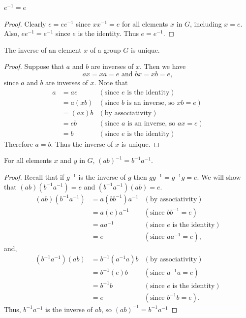 \newpage

\begin{proposition}
    $e^{-1} = e$
\end{proposition}
\begin{proof}
    Clearly $e = ee^{-1}$ since $xx^{-1} = e$ for all elements $x$ in $G$, including $x = e$. Also, $ee^{-1} = e^{-1}$ since $e$ is the identity. Thus $e = e^{-1}$.
\end{proof}

\begin{proposition}
    The inverse of an element $x$ of a group $G$ is unique.
\end{proposition}
\begin{proof}
    Suppose that $a$ and $b$ are inverses of $x$. Then we have
    \[
        ax = xa = e \text{ and } bx = xb = e,
    \]
    since $a$ and $b$ are inverses of $x$. Note that
    \begin{align*}
        a &= ae & (\text{since } e \text{ is the identity})\\
        &= a(xb) & (\text{since } b \text{ is an inverse, so } xb = e)\\
        &= (ax)b & (\text{by associativity})\\
        &= eb & (\text{since } a \text{ is an inverse, so } ax = e)\\
        &= b & (\text{since } e \text{ is the identity})
    \end{align*}
    Therefore $a = b$. Thus the inverse of $x$ is unique.
\end{proof}

\begin{proposition}
    For all elements $x$ and $y$ in $G$, $(ab)^{-1} = b^{-1}a^{-1}$.
\end{proposition}
\begin{proof}
    Recall that if $g^{-1}$ is the inverse of $g$ then $gg^{-1} = g^{-1}g = e$. We will show that $(ab)(b^{-1}a^{-1}) = e$ and $(b^{-1}a^{-1})(ab) = e$.
    \begin{align*}
        (ab)(b^{-1}a^{-1}) &= a(bb^{-1})a^{-1} & (\text{by associativity})\\
        &= a(e)a^{-1} & (\text{since } bb^{-1} = e)\\
        &= aa^{-1} & (\text{since } e \text{ is the identity})\\
        &= e & (\text{since } aa^{-1} = e),
    \end{align*}
    and,
    \begin{align*}
        (b^{-1}a^{-1})(ab) &= b^{-1}(a^{-1}a)b & (\text{by associativity})\\
        &= b^{-1}(e)b & (\text{since } a^{-1}a = e)\\
        &= b^{-1}b & (\text{since } e \text{ is the identity})\\
        &= e & (\text{since } b^{-1}b = e).
    \end{align*}
    Thus, $b^{-1}a^{-1}$ is the inverse of $ab$, so $(ab)^{-1} = b^{-1}a^{-1}$
\end{proof}

